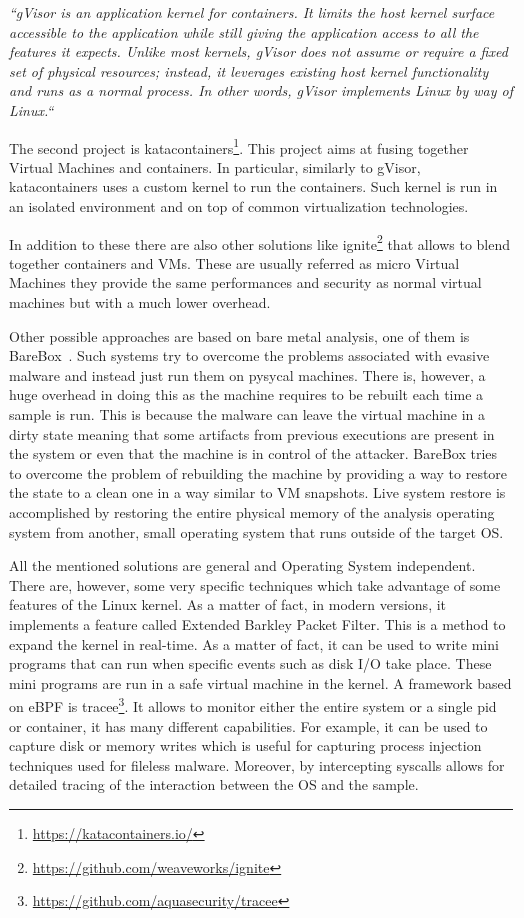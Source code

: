 \textit{``gVisor is an application kernel for containers. It limits the host kernel surface accessible to the application while still giving the application access to all the features it expects. Unlike most kernels, gVisor does not assume or require a fixed set of physical resources; instead, it leverages existing host kernel functionality and runs as a normal process. In other words, gVisor implements Linux by way of Linux.``}

The second project is katacontainers\footnote{\url{https://katacontainers.io/}}. This project aims at fusing together Virtual Machines and containers. In particular, similarly to gVisor, katacontainers uses a custom kernel to run the containers. Such kernel is run in an isolated environment and on top of common virtualization technologies. 

In addition to these there are also other solutions like ignite\footnote{\url{https://github.com/weaveworks/ignite}} that allows to blend together containers and VMs. These are usually referred as micro Virtual Machines they provide the same performances and security as normal virtual machines but with a much lower overhead. 

Other possible approaches are based on bare metal analysis, one of them is BareBox~\cite{bbox}. Such systems try to overcome the problems associated with evasive malware and instead just run them on pysycal machines. There is, however, a huge overhead in doing this as the machine requires to be rebuilt each time a sample is run. This is because the malware can leave the virtual machine in a dirty state meaning that some artifacts from previous executions are present in the system or even that the machine is in control of the attacker. BareBox tries to overcome the problem of rebuilding the machine by providing a way to restore the state to a clean one in a way similar to VM snapshots. Live system restore is accomplished by restoring the entire physical memory of the analysis operating system from another, small operating system that runs outside of the target OS. 

\bigskip
All the mentioned solutions are general and Operating System independent. There are, however, some very specific techniques which take advantage of some features of the Linux kernel. As a matter of fact, in modern versions, it implements a feature called Extended Barkley Packet Filter. This is a method to expand the kernel in real-time. As a matter of fact, it can be used to write mini programs that can run when specific events such as disk I/O take place. These mini programs are run in a safe virtual machine in the kernel. A framework based on eBPF is tracee\footnote{\url{https://github.com/aquasecurity/tracee}}. It allows to monitor either the entire system or a single pid or container, it has many different capabilities. For example, it can be used to capture disk or memory writes which is useful for capturing process injection techniques used for fileless malware. Moreover, by intercepting syscalls allows for detailed tracing of the interaction between the OS and the sample. 

